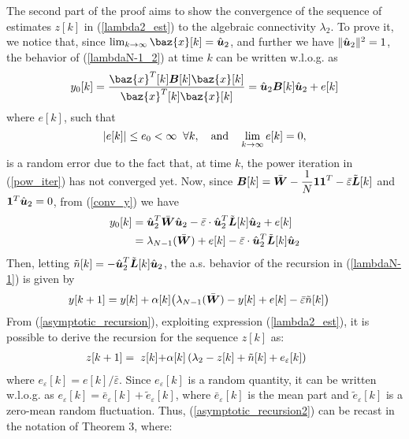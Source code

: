\documentclass[10pt,twocolumn]{IEEEtran}
\def\bB{\mbox{\boldmath $B$}}
\def\bL{\mbox{\boldmath $L$}}
\def\bW{\mbox{\boldmath $W$}}
\def\bu{\mbox{\boldmath $u$}}
\def\bx{\baz{x}}
\begin{document}
The second part of the proof aims to show the convergence of the sequence of estimates $z[k]$ in (\ref{lambda2_est}) to the algebraic connectivity $\lambda_{2}$. To prove it, we notice that, since $\lim_{k\rightarrow\infty}\bx[k]=\hat{\bu}_2$, and further we have $\|\hat{\bu}_2\|^2=1$, the behavior of (\ref{lambdaN-1_2}) at time $k$ can be written w.l.o.g. as
\begin{equation}\label{conv_y}
y_0[k]=\frac{\bx^T[k]\bB[k]\bx[k]}{\bx^T[k]\bx[k]}= \hat{\bu}_2\bB[k]\hat{\bu}_2+e[k]
\end{equation}
where $e[k]$, such that
\begin{equation}\label{eps_properties}
|e[k]|\leq e_0<\infty \;\; \forall k, \quad \hbox{and} \quad \lim_{k\rightarrow\infty}e[k]=0,
\end{equation}
is a random error due to the fact that, at time $k$, the power iteration in (\ref{pow_iter}) has not converged yet. Now, since $\displaystyle \bB[k]=\bar{\bW}-\frac{1}{N}\mathbf{1}\mathbf{1}^T-\bar{\varepsilon}\tilde{\bL}[k]$ and $\mathbf{1}^T\hat{\bu}_2=0$, from (\ref{conv_y}) we have
\begin{align}\label{conv_y2}
y_0[k]=\; &\hat{\bu}_2^T\bar{\bW}\hat{\bu}_2-\bar{\varepsilon}\cdot\hat{\bu}_2^T\tilde{\bL}[k]\hat{\bu}_2+e[k] \nonumber\\
=\; &\lambda_{N-1}(\bar{\bW})+e[k]-\bar{\varepsilon}\cdot\hat{\bu}_2^T\tilde{\bL}[k]\hat{\bu}_2
\end{align}
Then, letting $\tilde{n}[k]=-\hat{\bu}_2^T\tilde{\bL}[k]\hat{\bu}_2$, the a.s. behavior of the recursion in (\ref{lambdaN-1}) is given by
\begin{align}\label{asymptotic_recursion}
  \hspace{-.37cm}     y[k+1]=y[k]+\alpha[k]\big(\lambda_{N-1}(\bar{\bW})-y[k]+e[k]-\bar{\varepsilon}\tilde{n}[k]\big)
\end{align}
From (\ref{asymptotic_recursion}), exploiting expression (\ref{lambda2_est}), it is possible to derive the recursion for the sequence $z[k]$ as:
\begin{align}\label{asymptotic_recursion2}
 \hspace{-.2cm} z[k+1]= \hspace{.1cm}z[k]+&\alpha[k]\left(\lambda_{2}-z[k]+\tilde{n}[k]+e_{\varepsilon}[k]\right)
\end{align}
where $e_{\varepsilon}[k]=e[k]/\bar{\varepsilon}$. Since $e_{\varepsilon}[k]$ is a random quantity, it can be written w.l.o.g. as $e_{\varepsilon}[k]=\bar{e}_{\varepsilon}[k]+\tilde{e}_{\varepsilon}[k]$, where $\bar{e}_{\varepsilon}[k]$ is the mean part and $\tilde{e}_{\varepsilon}[k]$ is a zero-mean random fluctuation. Thus, (\ref{asymptotic_recursion2}) can be recast in the notation of Theorem 3, where:
\end{document}
